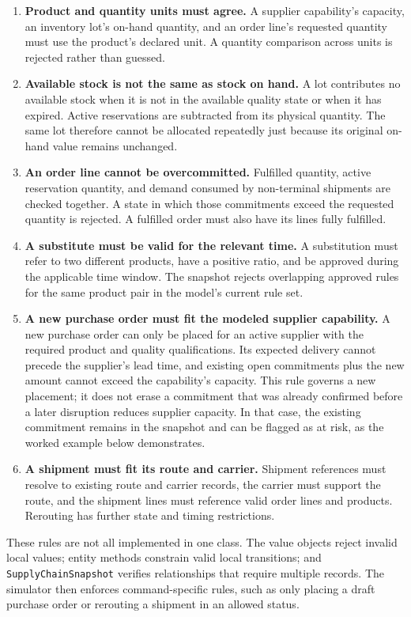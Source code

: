 \begin{enumerate}
  \item \textbf{Product and quantity units must agree.} A supplier capability's capacity, an inventory lot's on-hand quantity, and an order line's requested quantity must use the product's declared unit. A quantity comparison across units is rejected rather than guessed.
  \item \textbf{Available stock is not the same as stock on hand.} A lot contributes no available stock when it is not in the available quality state or when it has expired. Active reservations are subtracted from its physical quantity. The same lot therefore cannot be allocated repeatedly just because its original on-hand value remains unchanged.
  \item \textbf{An order line cannot be overcommitted.} Fulfilled quantity, active reservation quantity, and demand consumed by non-terminal shipments are checked together. A state in which those commitments exceed the requested quantity is rejected. A fulfilled order must also have its lines fully fulfilled.
  \item \textbf{A substitute must be valid for the relevant time.} A substitution must refer to two different products, have a positive ratio, and be approved during the applicable time window. The snapshot rejects overlapping approved rules for the same product pair in the model's current rule set.
  \item \textbf{A new purchase order must fit the modeled supplier capability.} A new purchase order can only be placed for an active supplier with the required product and quality qualifications. Its expected delivery cannot precede the supplier's lead time, and existing open commitments plus the new amount cannot exceed the capability's capacity. This rule governs a new placement; it does not erase a commitment that was already confirmed before a later disruption reduces supplier capacity. In that case, the existing commitment remains in the snapshot and can be flagged as at risk, as the worked example below demonstrates.
  \item \textbf{A shipment must fit its route and carrier.} Shipment references must resolve to existing route and carrier records, the carrier must support the route, and the shipment lines must reference valid order lines and products. Rerouting has further state and timing restrictions.
\end{enumerate}

These rules are not all implemented in one class. The value objects reject invalid local values; entity methods constrain valid local transitions; and \texttt{SupplyChainSnapshot} verifies relationships that require multiple records. The simulator then enforces command-specific rules, such as only placing a draft purchase order or rerouting a shipment in an allowed status.

